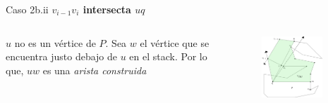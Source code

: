 \documentclass[aspectratio=169,xcolor=dvipsnames, t]{beamer}
\begin{document}
\begin{frame}{Caso 2b.ii}
  \textbf{$v_{i-1}v_{i}$ intersecta $uq$}\\
  \vspace{0.5cm}
  \begin{columns}
    \begin{column}{0.45\textwidth}
      $u$ no es un vértice de $P$. Sea $w$ el vértice que se encuentra justo debajo de $u$ en el stack. Por lo que, $uw$ es una \textit{arista construida}\\
      \vspace{0.5cm}
    \end{column}
    \begin{column}{0.45\textwidth}  %
      \vspace{-3cm}
      \begin{figure}
        \centering
        \includegraphics[width=0.85\textwidth]{imagenes/Caso2.7a.png}
      \end{figure}
    \end{column}
  \end{columns}
\end{frame}

\end{document}
